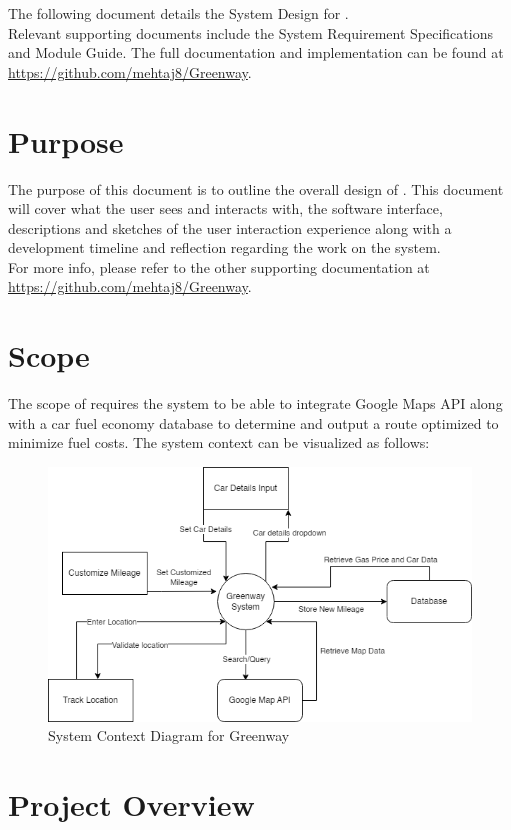 \documentclass[12pt, titlepage]{article}
\begin{document}
The following document details the System Design for \progname{}.\\
Relevant supporting documents include the System Requirement Specifications
and Module Guide. The full documentation and implementation can be
found at \url{https://github.com/mehtaj8/Greenway}.

\section{Purpose}

The purpose of this document is to outline the overall design of \progname{}. This document will cover what the user sees and interacts with, the software interface, descriptions and sketches of the user interaction experience along with a development timeline and reflection regarding the work on the system.\\

\noindent For more info, please refer to the other supporting documentation at \url{https://github.com/mehtaj8/Greenway}.

\section{Scope}
The scope of \progname{} requires the system to be able to integrate Google Maps API along with a car fuel economy database to determine and output a route optimized to minimize fuel costs. The system context can be visualized as follows: 
\begin{figure}[h!]
    \centering
    \includegraphics[scale=0.6]{Scope.png}
    \caption{System Context Diagram for Greenway}
\end{figure}

\section{Project Overview}
\end{document}
